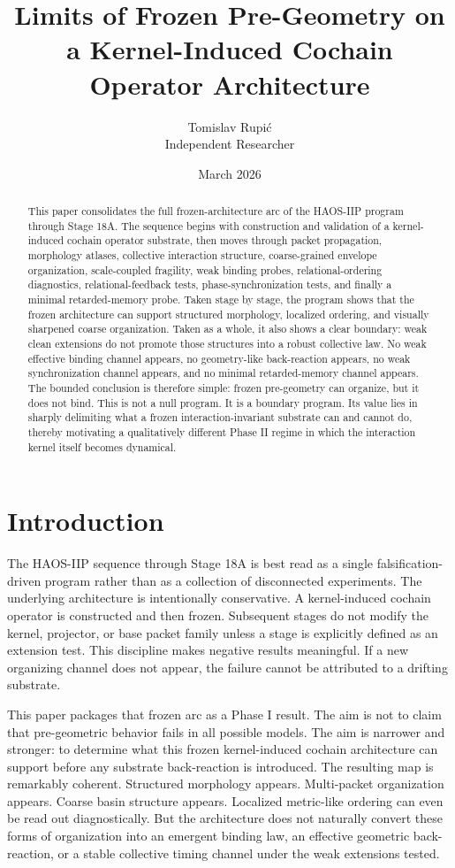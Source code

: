 \documentclass[11pt]{article}
\title{Limits of Frozen Pre-Geometry on a Kernel-Induced Cochain Operator Architecture}
\author{Tomislav Rupi\'c \\ Independent Researcher}
\date{March 2026}
\begin{document}
\maketitle

\begin{abstract}
This paper consolidates the full frozen-architecture arc of the HAOS-IIP program through Stage 18A. The sequence begins with construction and validation of a kernel-induced cochain operator substrate, then moves through packet propagation, morphology atlases, collective interaction structure, coarse-grained envelope organization, scale-coupled fragility, weak binding probes, relational-ordering diagnostics, relational-feedback tests, phase-synchronization tests, and finally a minimal retarded-memory probe. Taken stage by stage, the program shows that the frozen architecture can support structured morphology, localized ordering, and visually sharpened coarse organization. Taken as a whole, it also shows a clear boundary: weak clean extensions do not promote those structures into a robust collective law. No weak effective binding channel appears, no geometry-like back-reaction appears, no weak synchronization channel appears, and no minimal retarded-memory channel appears. The bounded conclusion is therefore simple: frozen pre-geometry can organize, but it does not bind. This is not a null program. It is a boundary program. Its value lies in sharply delimiting what a frozen interaction-invariant substrate can and cannot do, thereby motivating a qualitatively different Phase II regime in which the interaction kernel itself becomes dynamical.
\end{abstract}

\section{Introduction}

The HAOS-IIP sequence through Stage 18A is best read as a single falsification-driven program rather than as a collection of disconnected experiments. The underlying architecture is intentionally conservative. A kernel-induced cochain operator is constructed and then frozen. Subsequent stages do not modify the kernel, projector, or base packet family unless a stage is explicitly defined as an extension test. This discipline makes negative results meaningful. If a new organizing channel does not appear, the failure cannot be attributed to a drifting substrate.

This paper packages that frozen arc as a Phase I result. The aim is not to claim that pre-geometric behavior fails in all possible models. The aim is narrower and stronger: to determine what this frozen kernel-induced cochain architecture can support before any substrate back-reaction is introduced. The resulting map is remarkably coherent. Structured morphology appears. Multi-packet organization appears. Coarse basin structure appears. Localized metric-like ordering can even be read out diagnostically. But the architecture does not naturally convert these forms of organization into an emergent binding law, an effective geometric back-reaction, or a stable collective timing channel under the weak extensions tested.
\end{document}

